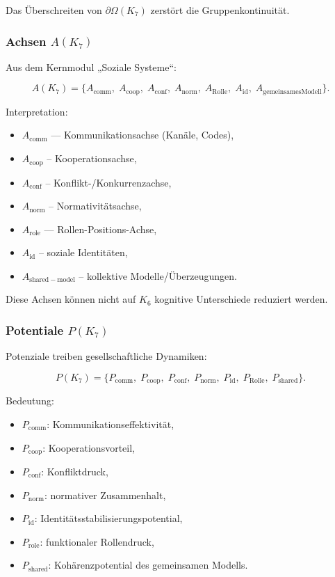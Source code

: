 Das Überschreiten von $\partial\Omega(K_7)$ zerstört die Gruppenkontinuität.

\subsubsection{Achsen \texorpdfstring{$A(K_7)$}{A(K_7)}}

Aus dem Kernmodul „Soziale Systeme“:

\[
A(K_7)=
\{
A_{\mathrm{comm}},\;
A_{\mathrm{coop}},\;
A_{\mathrm{conf}},\;
A_{\mathrm{norm}},\;
A_{\mathrm{Rolle}},\;
A_{\mathrm{id}},\;
A_{\mathrm{gemeinsames Modell}}
\}.
\]

Interpretation:
\begin{itemize}
    \item $A_{\mathrm{comm}}$ — Kommunikationsachse (Kanäle, Codes),
    \item $A_{\mathrm{coop}}$ – Kooperationsachse,
    \item $A_{\mathrm{conf}}$ – Konflikt-/Konkurrenzachse,
    \item $A_{\mathrm{norm}}$ – Normativitätsachse,
    \item $A_{\mathrm{role}}$ — Rollen-Positions-Achse,
    \item $A_{\mathrm{id}}$ – soziale Identitäten,
    \item $A_{\mathrm{shared-model}}$ – kollektive Modelle/Überzeugungen.
\end{itemize}

Diese Achsen können nicht auf $K_6$ kognitive Unterschiede reduziert werden.

\subsubsection{Potentiale \texorpdfstring{$P(K_7)$}{P(K_7)}}

Potenziale treiben gesellschaftliche Dynamiken:

\[
P(K_7)=
\{
P_{\mathrm{comm}},\;
P_{\mathrm{coop}},\;
P_{\mathrm{conf}},\;
P_{\mathrm{norm}},\;
P_{\mathrm{id}},\;
P_{\mathrm{Rolle}},\;
P_{\mathrm{shared}}
\}.
\]

Bedeutung:
\begin{itemize}
    \item $P_{\mathrm{comm}}$: Kommunikationseffektivität,
    \item $P_{\mathrm{coop}}$: Kooperationsvorteil,
    \item $P_{\mathrm{conf}}$: Konfliktdruck,
    \item $P_{\mathrm{norm}}$: normativer Zusammenhalt,
    \item $P_{\mathrm{id}}$: Identitätsstabilisierungspotential,
    \item $P_{\mathrm{role}}$: funktionaler Rollendruck,
    \item $P_{\mathrm{shared}}$: Kohärenzpotential des gemeinsamen Modells.
\end{itemize}

